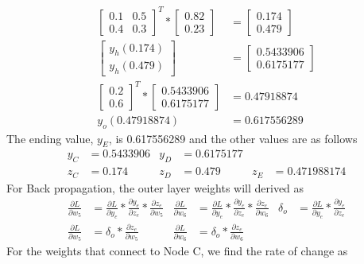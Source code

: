 \documentclass[12pt,english]{article}
\begin{document}
\begin{align*}
\begin{bmatrix} 0.1 & 0.5 \\ 0.4 & 0.3 \end{bmatrix}^T * \begin{bmatrix} 0.82 \\ 0.23 \end{bmatrix}  &= \begin{bmatrix} 0.174 \\ 0.479 \end{bmatrix} \\
\begin{bmatrix} y_h(0.174) \\ y_h(0.479) \end{bmatrix} &= \begin{bmatrix} 0.5433906 \\ 0.6175177 \end{bmatrix} \\
\begin{bmatrix} 0.2 \\ 0.6 \end{bmatrix}^T * \begin{bmatrix} 0.5433906 \\ 0.6175177 \end{bmatrix} &=0.47918874\\
y_o(0.47918874) &= 0.617556289
\end{align*}
The ending value, $y_E$, is 0.617556289 and the other values are as follows\\
\begin{align*}
y_C &=0.5433906 & y_D&=0.6175177 \\
 z_C &=0.174 & z_D&=0.479 & z_E&=0.471988174
\end{align*}
For Back propagation, the outer layer weights will derived as
\begin{align*}
\frac{\partial L}{\partial w_5} &=\frac{\partial L}{\partial y_e} * \frac{\partial y_e}{\partial z_e} * \frac{\partial z_e}{\partial w_5} &
\frac{\partial L}{\partial w_6} &=\frac{\partial L}{\partial y_e} * \frac{\partial y_e}{\partial z_e} * \frac{\partial z_e}{\partial w_6} &
\delta_o &= \frac{\partial L}{\partial y_e} * \frac{\partial y_e}{\partial z_e}\\
\frac{\partial L}{\partial w_5} &= \delta_o * \frac{\partial z_e}{\partial w_5} &
\frac{\partial L}{\partial w_6} &= \delta_o * \frac{\partial z_e}{\partial w_6} &
\end{align*}
 For the weights that connect to Node C, we find the rate of change as
\end{document}

